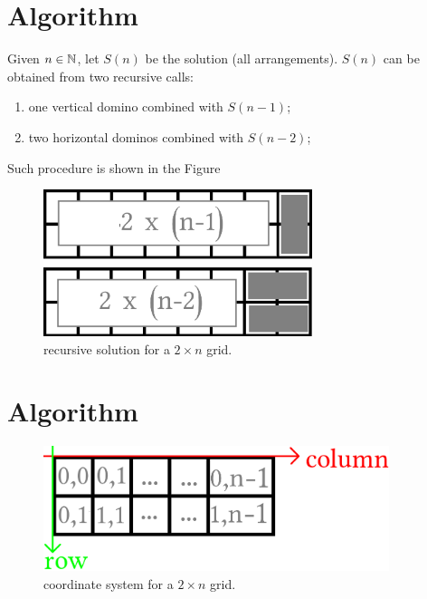 \section{Algorithm}

Given $n \in \mathbb{N}$, let $S(n)$ be the solution (all arrangements). $S(n)$ can be obtained from two recursive calls:
\begin{enumerate}
    \item one vertical domino combined with $S(n-1)$;
    \item two horizontal dominos combined with $S(n-2)$;
\end{enumerate}
Such procedure is shown in the Figure

\begin{figure}[H]
    \centering
    \includegraphics[width=0.7\textwidth]{images/domino_arrangements/2xn_recursive.png}
    \caption{recursive solution for a $2 \times n$ grid.}
\end{figure}

\section{Algorithm}

\begin{figure}[H]
    \centering
    \includegraphics[width=0.9\textwidth]{images/domino_arrangements/grid_cordinates.png}
    \caption{coordinate system for a $2 \times n$ grid.}
\end{figure}

\newcommand{\domino}[2]{\mbox{\textbf{Domino}}\left[\tuple{#1}, vertical\right]}
\newcommand{\dominoV}[1]{\domino{#1}{vertical}}
\newcommand{\dominoH}[1]{\domino{#1}{horizontal}}
\newcommand{\DA}{domino\_arrangements}

